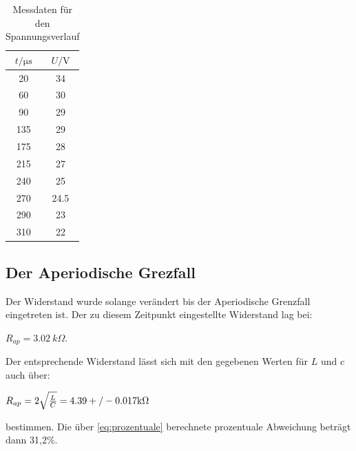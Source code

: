 \documentclass[
  bibliography=totoc,     %
  captions=tableheading,  %
  titlepage=firstiscover, %
]{scrartcl}
\begin{document}
  \FloatBarrier

  \begin{table}[h]
    \centering
    \caption{Messdaten für den Spannungsverlauf}
    \label{tab:tab2}
    \begin{tabular}{c c}
      \toprule
      $t / \si{\micro\second}$ & $U / \si{\volt}$ \\
      \midrule
      20 & 34\\
      60 & 30\\
      90 & 29\\
      135 & 29\\
      175 & 28\\
      215 & 27\\
      240 & 25\\
      270 & 24.5\\
      290 & 23\\
      310 & 22\\
      \bottomrule
    \end{tabular}
  \end{table}
  \FloatBarrier

    \subsection{Der Aperiodische Grezfall}
    \label{sec:apg}
    Der Widerstand wurde solange verändert bis der Aperiodische Grenzfall eingetreten ist. Der zu diesem 
    Zeitpunkt eingestellte Widerstand lag bei:
    \begin{center}
        $R_{ap}=\SI[]{3.02}[]{k\Omega}$.\\
    \end{center}
    Der entsprechende Widerstand lässt sich mit den gegebenen Werten für $L$ und $c$ auch über:
    \begin{center}
        $R_{ap}=2\sqrt{\frac{L}{C}}=4.39+/-0.017\si[]{k\Omega}$
    \end{center}
    bestimmen. Die über \autoref{eq:prozentuale} berechnete prozentuale Abweichung beträgt dann 31,2\%. 
\end{document}
